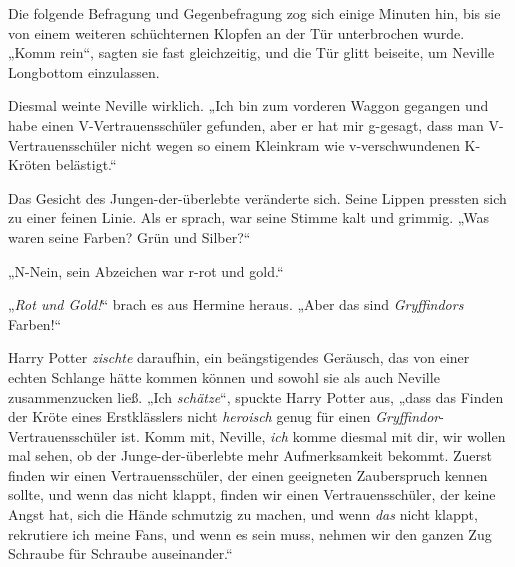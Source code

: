 Die folgende Befragung und Gegenbefragung zog sich einige Minuten hin, bis sie von einem weiteren schüchternen Klopfen an der Tür unterbrochen wurde.
„Komm rein“, sagten sie fast gleichzeitig, und die Tür glitt beiseite, um Neville Longbottom einzulassen.

Diesmal weinte Neville wirklich.
„Ich bin zum vorderen Waggon gegangen und habe einen V-Vertrauensschüler gefunden, aber er hat mir g-gesagt, dass man V-Vertrauensschüler nicht wegen so einem Kleinkram wie v-verschwundenen K-Kröten belästigt.“

Das Gesicht des Jungen-der-überlebte veränderte sich. Seine Lippen pressten sich zu einer feinen Linie. Als er sprach, war seine Stimme kalt und grimmig.
„Was waren seine Farben? Grün und Silber?“

„N-Nein, sein Abzeichen war r-rot und gold.“

„\emph{Rot und Gold!}“ brach es aus Hermine heraus.
„Aber das sind \emph{Gryffindors} Farben!“

Harry Potter \emph{zischte} daraufhin, ein beängstigendes Geräusch, das von einer echten Schlange hätte kommen können und sowohl sie als auch Neville zusammenzucken ließ.
„Ich \emph{schätze}“, spuckte Harry Potter aus, „dass das Finden der Kröte eines Erstklässlers nicht \emph{heroisch} genug für einen \emph{Gryffindor}-Vertrauensschüler ist. Komm mit, Neville, \emph{ich} komme diesmal mit dir, wir wollen mal sehen, ob der Junge-der-überlebte mehr Aufmerksamkeit bekommt. Zuerst finden wir einen Vertrauensschüler, der einen geeigneten Zauberspruch kennen sollte, und wenn das nicht klappt, finden wir einen Vertrauensschüler, der keine Angst hat, sich die Hände schmutzig zu machen, und wenn \emph{das} nicht klappt, rekrutiere ich meine Fans, und wenn es sein muss, nehmen wir den ganzen Zug Schraube für Schraube auseinander.“

